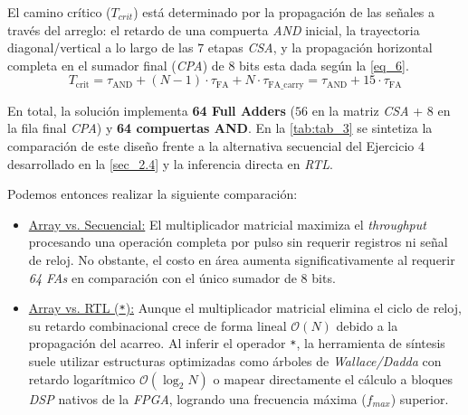 \documentclass[12pt,a4paper]{article}
\begin{document}
El camino crítico ($T_{crit}$) está determinado por la propagación de las señales a través del arreglo: el retardo de una compuerta \textit{AND} inicial, la trayectoria diagonal/vertical a lo largo de las $7$ etapas \textit{CSA}, y la propagación horizontal completa en el sumador final (\textit{CPA}) de $8$ bits esta dada según la \autoref{eq_6}. \cite{b2}
\begin{equation}
    T_{\text{crit}} = \tau_{\text{AND}} + (N - 1) \cdot \tau_{\text{FA}} + N \cdot \tau_{\text{FA\_carry}} = \tau_{\text{AND}} + 15 \cdot \tau_{\text{FA}}
    \label{eq_6}
\end{equation}

En total, la solución implementa \textbf{64 Full Adders} ($56$ en la matriz \textit{CSA} + $8$ en la fila final \textit{CPA}) y \textbf{64 compuertas AND}. En la \autoref{tab:tab_3} se sintetiza la comparación de este diseño frente a la alternativa secuencial del Ejercicio $4$ desarrollado en la \autoref{sec_2.4} y la inferencia directa en \textit{RTL}.

Podemos entonces realizar la siguiente comparación:
\begin{itemize}
    \item \underline{Array vs. Secuencial:} El multiplicador matricial maximiza el \textit{throughput} procesando una operación completa por pulso sin requerir registros ni señal de reloj. No obstante, el costo en área aumenta significativamente al requerir \textit{64 FAs} en comparación con el único sumador de 8 bits.
    
    \item \underline{Array vs. RTL (\texttt{*}):} Aunque el multiplicador matricial elimina el ciclo de reloj, su retardo combinacional crece de forma lineal $\mathcal{O}(N)$ debido a la propagación del acarreo. Al inferir el operador \texttt{*}, la herramienta de síntesis suele utilizar estructuras optimizadas como árboles de \textit{Wallace/Dadda} con retardo logarítmico $\mathcal{O}(\log_2 N)$ o mapear directamente el cálculo a bloques \textit{DSP} nativos de la \textit{FPGA}, logrando una frecuencia máxima ($f_{max}$) superior.
\end{itemize}
\end{document}
